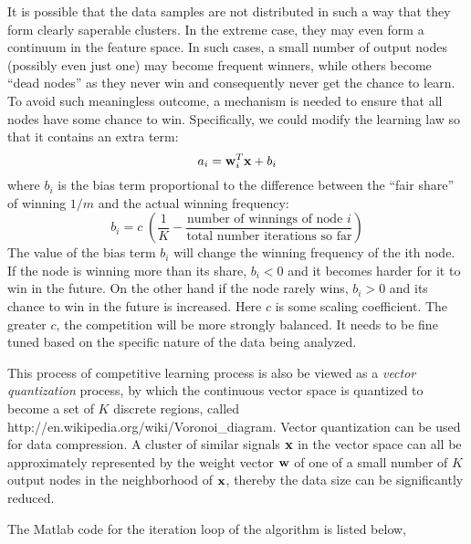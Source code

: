 \documentclass{article}
\begin{document}

It is possible that the data samples are not distributed in such a way
that they form clearly saperable clusters. In the extreme case, they may 
even form a continuum in the feature space. In such cases, a small number 
of output nodes (possibly even just one) may become frequent winners, 
while others become ``dead nodes'' as they never win and consequently 
never get the chance to learn. To avoid such meaningless outcome, a 
mechanism is needed to ensure that all nodes have some chance to win. 
Specifically, we could modify the learning law so that it contains an 
extra term:
\begin{equation}
  a_i={\bf w}_i^T{\bf x}+b_i
\end{equation}
where $b_i$ is the bias term proportional to the difference between the 
``fair share'' of winning $1/m$ and the actual winning frequency:
\begin{equation}
  b_i=c\;\left(\frac{1}{K}
  -\frac{\mbox{number of winnings of node $i$}}{\mbox{total number iterations so far}}\right)
\end{equation}
The value of the bias term $b_i$ will change the winning frequency of the
ith node. If the node is winning more than its share, $b_i<0$ and it becomes
harder for it to win in the future. On the other hand if the node rarely 
wins, $b_i>0$ and its chance to win in the future is increased. Here $c$ 
is some scaling coefficient. The greater $c$, the competition will be more 
strongly balanced. It needs to be fine tuned based on the specific nature 
of the data being analyzed.

This process of competitive learning process is also be viewed as a
{\em vector quantization} process, by which the continuous vector space 
is quantized to become a set of $K$ discrete regions, called 
{http://en.wikipedia.org/wiki/Voronoi_diagram}. 
Vector quantization can be used for data compression. A cluster of similar
signals ${\bf x}$ in the vector space can all be approximately represented 
by the weight vector ${\bf w}$ of one of a small number of $K$ output nodes 
in the neighborhood of ${\bf x}$, thereby the data size can be significantly 
reduced. 

The Matlab code for the iteration loop of the algorithm is listed below,
\end{document}

